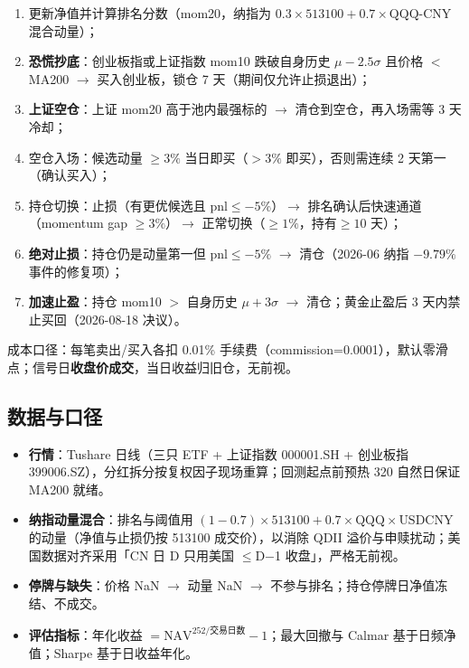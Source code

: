 \documentclass[11pt]{ctexart}
\begin{document}
\begin{enumerate}
  \item 更新净值并计算排名分数（mom20，纳指为 $0.3\times513100 + 0.7\times\text{QQQ-CNY}$ 混合动量）；
  \item \textbf{恐慌抄底}：创业板指或上证指数 mom10 跌破自身历史 $\mu-2.5\sigma$ 且价格 $<$ MA200 $\rightarrow$ 买入创业板，锁仓 7 天（期间仅允许止损退出）；
  \item \textbf{上证空仓}：上证 mom20 高于池内最强标的 $\rightarrow$ 清仓到空仓，再入场需等 3 天冷却；
  \item 空仓入场：候选动量 $\ge3\%$ 当日即买（$>3\%$ 即买），否则需连续 2 天第一（确认买入）；
  \item 持仓切换：止损（有更优候选且 pnl$\le-5\%$）$\rightarrow$ 排名确认后快速通道（momentum gap $\ge3\%$）$\rightarrow$ 正常切换（$\ge1\%$，持有$\ge10$ 天）；
  \item \textbf{绝对止损}：持仓仍是动量第一但 pnl$\le-5\%$ $\rightarrow$ 清仓（2026-06 纳指 $-9.79\%$ 事件的修复项）；
  \item \textbf{加速止盈}：持仓 mom10 $>$ 自身历史 $\mu+3\sigma$ $\rightarrow$ 清仓；黄金止盈后 3 天内禁止买回（2026-08-18 决议）。
\end{enumerate}

成本口径：每笔卖出/买入各扣 0.01\% 手续费（commission=0.0001），默认零滑点；信号日\textbf{收盘价成交}，当日收益归旧仓，无前视。

\subsection{数据与口径}

\begin{itemize}
  \item \textbf{行情}：Tushare 日线（三只 ETF + 上证指数 000001.SH + 创业板指 399006.SZ），分红拆分按复权因子现场重算；回测起点前预热 320 自然日保证 MA200 就绪。
  \item \textbf{纳指动量混合}：排名与阈值用 $(1-0.7)\times513100 + 0.7\times\text{QQQ}\times\text{USDCNY}$ 的动量（净值与止损仍按 513100 成交价），以消除 QDII 溢价与申赎扰动；美国数据对齐采用「CN 日 D 只用美国 $\le$D$-$1 收盘」，严格无前视。
  \item \textbf{停牌与缺失}：价格 NaN $\rightarrow$ 动量 NaN $\rightarrow$ 不参与排名；持仓停牌日净值冻结、不成交。
  \item \textbf{评估指标}：年化收益 $= \text{NAV}^{252/\text{交易日数}}-1$；最大回撤与 Calmar 基于日频净值；Sharpe 基于日收益年化。
\end{itemize}
\end{document}
